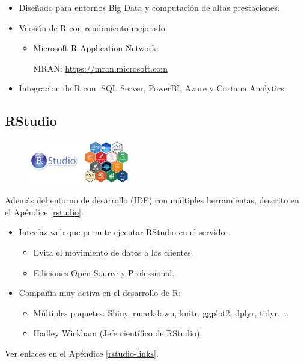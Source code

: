 \documentclass[]{book}
\begin{document}
\begin{itemize}
\item
  Diseñado para entornos Big Data y computación de altas prestaciones.
\item
  Versión de R con rendimiento mejorado.

  \begin{itemize}
  \item
    Microsoft R Application Network:

    MRAN: \url{https://mran.microsoft.com}
  \end{itemize}
\item
  Integracion de R con: SQL Server, PowerBI, Azure y Cortana Analytics.
\end{itemize}

\subsection{RStudio}\label{rstudio-com}

\begin{figure}
\centering
\includegraphics[width=0.40000\textwidth]{figuras/rstudio_stickers.png}
\caption{}
\end{figure}

Además del entorno de desarrollo (IDE) con múltiples herramientas,
descrito en el Apéndice \ref{rstudio}:

\begin{itemize}
\item
  Interfaz web que permite ejecutar RStudio en el servidor.

  \begin{itemize}
  \item
    Evita el movimiento de datos a los clientes.
  \item
    Ediciones Open Source y Professional.
  \end{itemize}
\item
  Compañía muy activa en el desarrollo de R:

  \begin{itemize}
  \item
    Múltiples paquetes: Shiny, rmarkdown, knitr, ggplot2, dplyr, tidyr,
    \ldots{}
  \item
    Hadley Wickham (Jefe científico de RStudio).
  \end{itemize}
\end{itemize}

Ver enlaces en el Apéndice \ref{rstudio-links}.


\end{document}
